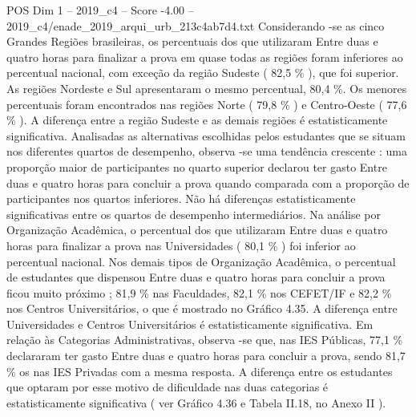 \begin{textsample}{POS Dim 1 – 2019\_c4 – Score -4.00 – 2019\_c4/enade\_2019\_arqui\_urb\_213c4ab7d4.txt}
Considerando -se as cinco Grandes Regiões brasileiras, os percentuais dos que utilizaram Entre duas e quatro horas para finalizar a prova em quase todas as regiões foram inferiores ao percentual nacional, com exceção da região Sudeste ( 82,5 \% ), que foi superior.
As regiões Nordeste e Sul apresentaram o mesmo percentual, 80,4 \%.
Os menores percentuais foram encontrados nas regiões Norte ( 79,8 \% ) e Centro-Oeste ( 77,6 \% ).
A diferença entre a região Sudeste e as demais regiões é estatisticamente significativa.
Analisadas as alternativas escolhidas pelos estudantes que se situam nos diferentes quartos de desempenho, observa -se uma tendência crescente : uma proporção maior de participantes no quarto superior declarou ter gasto Entre duas e quatro horas para concluir a prova quando comparada com a proporção de participantes nos quartos inferiores.
Não há diferenças estatisticamente significativas entre os quartos de desempenho intermediários.
Na análise por Organização Acadêmica, o percentual dos que utilizaram Entre duas e quatro horas para finalizar a prova nas Universidades ( 80,1 \% ) foi inferior ao percentual nacional.
Nos demais tipos de Organização Acadêmica, o percentual de estudantes que dispensou Entre duas e quatro horas para concluir a prova ficou muito próximo ; 81,9 \% nas Faculdades, 82,1 \% nos CEFET/IF e 82,2 \% nos Centros Universitários, o que é mostrado no Gráfico 4.35.
A diferença entre Universidades e Centros Universitários é estatisticamente significativa.
Em relação às Categorias Administrativas, observa -se que, nas IES Públicas, 77,1 \% declararam ter gasto Entre duas e quatro horas para concluir a prova, sendo 81,7 \% os nas IES Privadas com a mesma resposta.
A diferença entre os estudantes que optaram por esse motivo de dificuldade nas duas categorias é estatisticamente significativa ( ver Gráfico 4.36 e Tabela II.18, no Anexo II ).

\end{textsample}
